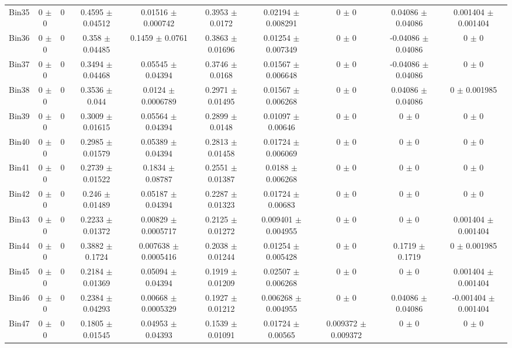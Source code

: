 \begin{tabular}{@{\extracolsep{4pt}}lccccccccc@{}}
     Bin35 & 0 $\pm$ 0 & 0 & 0.4595 $\pm$ 0.04512 & 0.01516 $\pm$ 0.000742 & 0.3953 $\pm$ 0.0172 & 0.02194 $\pm$ 0.008291 & 0 $\pm$ 0 & 0.04086 $\pm$ 0.04086 & 0.001404 $\pm$ 0.001404 \\ 
     Bin36 & 0 $\pm$ 0 & 0 & 0.358 $\pm$ 0.04485 & 0.1459 $\pm$ 0.0761 & 0.3863 $\pm$ 0.01696 & 0.01254 $\pm$ 0.007349 & 0 $\pm$ 0 & -0.04086 $\pm$ 0.04086 & 0 $\pm$ 0 \\ 
     Bin37 & 0 $\pm$ 0 & 0 & 0.3494 $\pm$ 0.04468 & 0.05545 $\pm$ 0.04394 & 0.3746 $\pm$ 0.0168 & 0.01567 $\pm$ 0.006648 & 0 $\pm$ 0 & -0.04086 $\pm$ 0.04086 & 0 $\pm$ 0 \\ 
     Bin38 & 0 $\pm$ 0 & 0 & 0.3536 $\pm$ 0.044 & 0.0124 $\pm$ 0.0006789 & 0.2971 $\pm$ 0.01495 & 0.01567 $\pm$ 0.006268 & 0 $\pm$ 0 & 0.04086 $\pm$ 0.04086 & 0 $\pm$ 0.001985 \\ 
     Bin39 & 0 $\pm$ 0 & 0 & 0.3009 $\pm$ 0.01615 & 0.05564 $\pm$ 0.04394 & 0.2899 $\pm$ 0.0148 & 0.01097 $\pm$ 0.00646 & 0 $\pm$ 0 & 0 $\pm$ 0 & 0 $\pm$ 0 \\ 
     Bin40 & 0 $\pm$ 0 & 0 & 0.2985 $\pm$ 0.01579 & 0.05389 $\pm$ 0.04394 & 0.2813 $\pm$ 0.01458 & 0.01724 $\pm$ 0.006069 & 0 $\pm$ 0 & 0 $\pm$ 0 & 0 $\pm$ 0 \\ 
     Bin41 & 0 $\pm$ 0 & 0 & 0.2739 $\pm$ 0.01522 & 0.1834 $\pm$ 0.08787 & 0.2551 $\pm$ 0.01387 & 0.0188 $\pm$ 0.006268 & 0 $\pm$ 0 & 0 $\pm$ 0 & 0 $\pm$ 0 \\ 
     Bin42 & 0 $\pm$ 0 & 0 & 0.246 $\pm$ 0.01489 & 0.05187 $\pm$ 0.04394 & 0.2287 $\pm$ 0.01323 & 0.01724 $\pm$ 0.00683 & 0 $\pm$ 0 & 0 $\pm$ 0 & 0 $\pm$ 0 \\ 
     Bin43 & 0 $\pm$ 0 & 0 & 0.2233 $\pm$ 0.01372 & 0.00829 $\pm$ 0.0005717 & 0.2125 $\pm$ 0.01272 & 0.009401 $\pm$ 0.004955 & 0 $\pm$ 0 & 0 $\pm$ 0 & 0.001404 $\pm$ 0.001404 \\ 
     Bin44 & 0 $\pm$ 0 & 0 & 0.3882 $\pm$ 0.1724 & 0.007638 $\pm$ 0.0005416 & 0.2038 $\pm$ 0.01244 & 0.01254 $\pm$ 0.005428 & 0 $\pm$ 0 & 0.1719 $\pm$ 0.1719 & 0 $\pm$ 0.001985 \\ 
     Bin45 & 0 $\pm$ 0 & 0 & 0.2184 $\pm$ 0.01369 & 0.05094 $\pm$ 0.04394 & 0.1919 $\pm$ 0.01209 & 0.02507 $\pm$ 0.006268 & 0 $\pm$ 0 & 0 $\pm$ 0 & 0.001404 $\pm$ 0.001404 \\ 
     Bin46 & 0 $\pm$ 0 & 0 & 0.2384 $\pm$ 0.04293 & 0.00668 $\pm$ 0.0005329 & 0.1927 $\pm$ 0.01212 & 0.006268 $\pm$ 0.004955 & 0 $\pm$ 0 & 0.04086 $\pm$ 0.04086 & -0.001404 $\pm$ 0.001404 \\ 
     Bin47 & 0 $\pm$ 0 & 0 & 0.1805 $\pm$ 0.01545 & 0.04953 $\pm$ 0.04393 & 0.1539 $\pm$ 0.01091 & 0.01724 $\pm$ 0.00565 & 0.009372 $\pm$ 0.009372 & 0 $\pm$ 0 & 0 $\pm$ 0 \\ 

\end{tabular}
